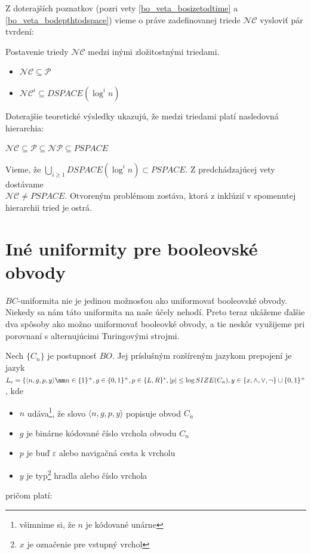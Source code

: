{Z doterajších poznatkov (pozri vety \ref{bo_veta_bosizetodtime} a \ref{bo_veta_bodepthtodspace})
vieme o práve zadefinovanej triede $\mathcal{NC}$ vysloviť pár tvrdení:

\begin{veta}
Postavenie triedy $\mathcal{NC}$ medzi inými zložitostnými triedami.
\begin{itemize}
  \item $\mathcal{NC}\subseteq\mathcal{P}$
  \item $\mathcal{NC}^i\subseteq DSPACE(\log^i n)$
\end{itemize}
\end{veta}

Doterajšie teoretické výsledky ukazujú, že medzi triedami platí nasledovná hierarchia:

\centerline{$\mathcal{NC}\subseteq\mathcal{P}\subseteq\mathcal{NP}\subseteq PSPACE$}

Vieme, že $\bigcup\limits_{i\geq 1} DSPACE(\log^i n)\subset PSPACE$. Z predchádzajúcej vety
dostávame\\ $\mathcal{NC}\neq PSPACE$. Otvoreným problémom zostáva, ktorá z inklúzií v spomenutej
hierarchii tried je ostrá.

\section{Iné uniformity pre booleovské obvody}

$BC$-uniformita nie je jedinou možnosťou ako uniformovať
booleovské obvody. Niekedy sa nám táto uniformita na naše účely
nehodí. Preto teraz ukážeme ďalšie dva spôsoby ako možno
uniformovať booleovké obvody, a tie neskôr využijeme pri porovnaní
s alternujúcimi Turingovými strojmi.

\begin{definicia}
Nech $\{ C_n\}$ je postupnosť $BO$. Jej príslušným rozšíreným
jazykom prepojení je jazyk $L_e=\{
\\ \langle n,g,p,y\rangle\mm
n\in\{ 1\}^+, g\in\{ 0,1\}^+, p\in\{ L,R\}^*, |p|\leq\log
SIZE(C_n), y\in \{ x, \wedge, \vee, \neg\}\cup\{ 0,1\}^+$, kde
\begin{itemize}
  \item $n$ udáva\footnote{všimnime si, že $n$ je kódované unárne},
  že slovo $\langle n,g,p,y\rangle$ popisuje obvod $C_n$
  \item $g$ je binárne kódované číslo vrchola obvodu $C_n$
  \item $p$ je buď $\varepsilon$ alebo navigačná cesta k vrcholu
  \item $y$ je typ\footnote{$x$ je označenie pre vstupný vrchol}
  hradla alebo číslo vrchola
\end{itemize}
pričom platí:


\end{definicia}}
